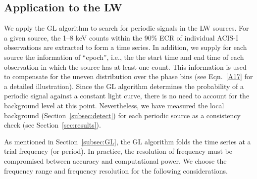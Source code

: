 \documentclass[fleqn,usenatbib]{mnras}
\begin{document}
\subsection{Application to the LW}\label{subsec:appli}
We apply the GL algorithm to search for periodic signals in the LW sources. 
For a given source, the 1--8 keV counts within the 90\% ECR of individual ACIS-I observations are extracted to form a time series.  
In addition, we supply for each source the information of ``epoch'', i.e., the the start time and end time of each  observation in which the source has at least one count. This information is used to compensate for the uneven distribution over the phase bins (see Eqn.~\ref{A17} for a detailed illustration). 
Since the GL algorithm determines the probability of a periodic signal against a constant light curve, there is no need to account for the background level at this point. 
Nevertheless, we have measured the local background (Section~\ref{subsec:detect}) for each periodic source as a consistency check (see Section~\ref{sec:results}). 

As mentioned in Section~\ref{subsec:GL}, the GL algorithm folds the time series at a trial frequency (or period). 
In practice, the resolution of frequency must be compromised between accuracy and computational power. We choose the frequency range and frequency resolution for the following considerations.
\end{document}
